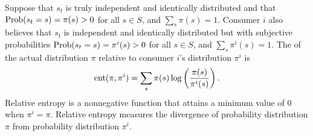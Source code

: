  Suppose that $s_t$ is
truly independent and identically distributed and that
${\rm Prob}(s_t = s) = \pi(s)>0$ for all $s\in S$,
and $\sum_s \pi(s)=1$.
Consumer $i$ also believes that $s_t$ is
independent and identically distributed but with
subjective probabilities ${\rm Prob}(s_t = s) = \pi^i(s)>0$
for all $s\in S$, and $\sum_s \pi^i(s)=1$.
The  of the actual distribution $\pi$
relative to consumer $i$'s distribution $\pi^i$ is
$$ {\rm ent}(\pi, \pi^i) = \sum_s \pi(s)
\log \left({\frac{\pi(s)}{\pi^i(s)}}\right).
$$
Relative entropy is a nonnegative function that attains
a minimum value of 0 when $\pi^i=\pi$.
Relative entropy measures the divergence of probability distribution $\pi$ from probability
 distribution $\pi^i$. %

